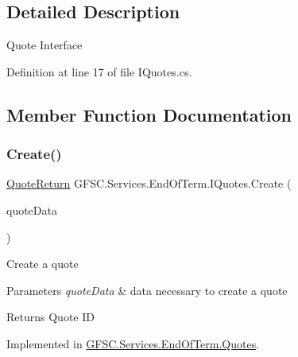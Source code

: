 \subsection{Detailed Description}
Quote Interface 



Definition at line 17 of file I\+Quotes.\+cs.



\subsection{Member Function Documentation}
\mbox{\label{interface_g_f_s_c_1_1_services_1_1_end_of_term_1_1_i_quotes_a7290f204a4faa7f07a03b64d32a1617e}} 
\subsubsection{\texorpdfstring{Create()}{Create()}}
{\footnotesize\ttfamily \mbox{\hyperlink{class_g_f_s_c_1_1_services_1_1_end_of_term_1_1_quote_return}{Quote\+Return}} G\+F\+S\+C.\+Services.\+End\+Of\+Term.\+I\+Quotes.\+Create (\begin{DoxyParamCaption}\item[{\mbox{\hyperlink{class_g_f_s_c_1_1_services_1_1_end_of_term_1_1_quote_request}{Quote\+Request}}}]{quote\+Data }\end{DoxyParamCaption})}



Create a quote 


\begin{DoxyParams}{Parameters}
{\em quote\+Data} & data necessary to create a quote\\
\hline
\end{DoxyParams}
\begin{DoxyReturn}{Returns}
Quote ID
\end{DoxyReturn}


Implemented in \mbox{\hyperlink{class_g_f_s_c_1_1_services_1_1_end_of_term_1_1_quotes_a382f58b87dd3cd8fa745e9c77f7d6d13}{G\+F\+S\+C.\+Services.\+End\+Of\+Term.\+Quotes}}.

\mbox{\label{interface_g_f_s_c_1_1_services_1_1_end_of_term_1_1_i_quotes_a013eda014c2d0fef34e334f7c868d19c}} 
